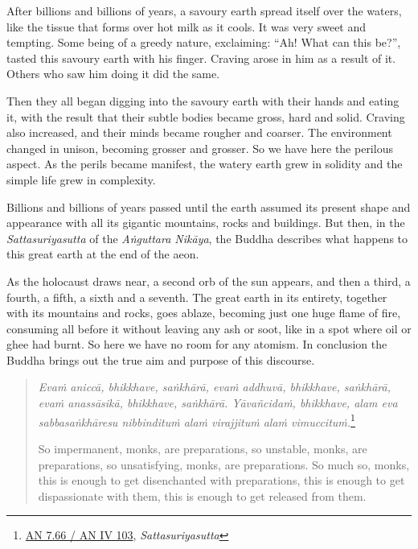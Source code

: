 After billions and billions of years, a savoury earth spread itself over the waters, like the tissue that forms over hot milk as it cools. It was very sweet and tempting. Some being of a greedy nature, exclaiming: ``Ah! What can this be?'', tasted this savoury earth with his finger. Craving arose in him as a result of it. Others who saw him doing it did the same.

Then they all began digging into the savoury earth with their hands and eating it, with the result that their subtle bodies became gross, hard and solid. Craving also increased, and their minds became rougher and coarser. The environment changed in unison, becoming grosser and grosser. So we have here the perilous aspect. As the perils became manifest, the watery earth grew in solidity and the simple life grew in complexity.

Billions and billions of years passed until the earth assumed its present shape and appearance with all its gigantic mountains, rocks and buildings. But then, in the \emph{Sattasuriyasutta} of the \emph{Aṅguttara Nikāya}, the Buddha describes what happens to this great earth at the end of the aeon.

As the holocaust draws near, a second orb of the sun appears, and then a third, a fourth, a fifth, a sixth and a seventh. The great earth in its entirety, together with its mountains and rocks, goes ablaze, becoming just one huge flame of fire, consuming all before it without leaving any ash or soot, like in a spot where oil or ghee had burnt. So here we have no room for any atomism. In conclusion the Buddha brings out the true aim and purpose of this discourse.

\begin{quote}
\emph{Evaṁ aniccā, bhikkhave, saṅkhārā, evaṁ addhuvā, bhikkhave, saṅkhārā, evaṁ anassāsikā, bhikkhave, saṅkhārā. Yāvañcidaṁ, bhikkhave, alam eva sabbasaṅkhāresu nibbindituṁ alaṁ virajjituṁ alaṁ vimuccituṁ.}\footnote{\href{https://suttacentral.net/an7.66/pli/ms}{AN 7.66 / AN IV 103}, \emph{Sattasuriyasutta}}

So impermanent, monks, are preparations, so unstable, monks, are preparations, so unsatisfying, monks, are preparations. So much so, monks, this is enough to get disenchanted with preparations, this is enough to get dispassionate with them, this is enough to get released from them.
\end{quote}
